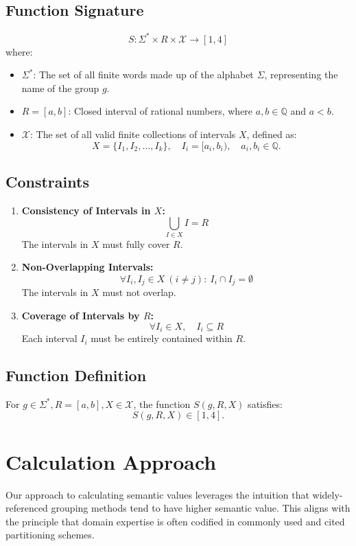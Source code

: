 \documentclass{article}
\begin{document}
\subsection*{Function Signature}
\[
S: \Sigma^* \times R \times \mathcal{X} \to [1, 4]
\]
where:
\begin{itemize}
    \item \( \Sigma^* \): The set of all finite words made up of the alphabet \( \Sigma \), representing the name of the group \( g \).
    \item \( R = [a, b] \): Closed interval of rational numbers, where \( a, b \in \mathbb{Q} \) and \( a < b \).
    \item \( \mathcal{X} \): The set of all valid finite collections of intervals \( X \), defined as: \[
    X = \{ I_1, I_2, \dots, I_k \}, \quad I_i = [a_i, b_i), \quad a_i, b_i \in \mathbb{Q}.
    \]
\end{itemize}

\subsection*{Constraints}
\begin{enumerate}
    \item \textbf{Consistency of Intervals in \( X \):}
    \[
    \bigcup_{I \in X} I = R
    \]
    The intervals in \( X \) must fully cover \( R \).

    \item \textbf{Non-Overlapping Intervals:}
    \[
    \forall I_i, I_j \in X \ (i \neq j): \ I_i \cap I_j = \emptyset
    \]
    The intervals in \( X \) must not overlap.

    \item \textbf{Coverage of Intervals by \( R \):}
    \[
    \forall I_i \in X, \quad I_i \subseteq R
    \]
    Each interval \( I_i \) must be entirely contained within \( R \).
\end{enumerate}

\subsection*{Function Definition}
For \( g \in \Sigma^*, R = [a, b], X \in \mathcal{X} \), the function \( S(g, R, X) \) satisfies:
\[
S(g, R, X) \in [1, 4].
\]

\section*{Calculation Approach}
Our approach to calculating semantic values leverages the intuition that widely-referenced grouping methods tend to have higher semantic value. This aligns with the principle that domain expertise is often codified in commonly used and cited partitioning schemes.
\end{document}
